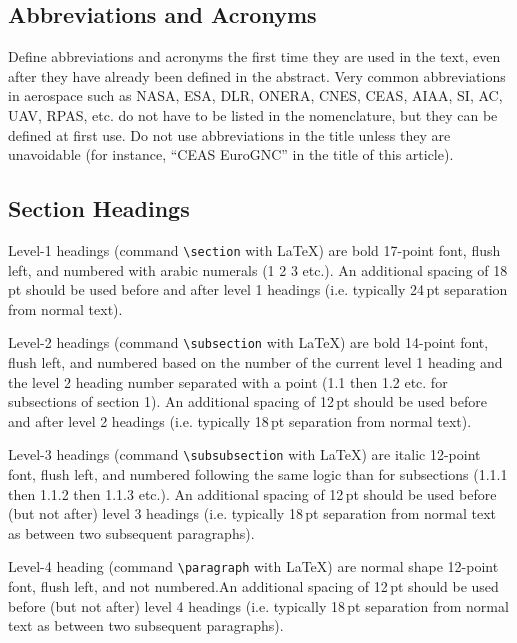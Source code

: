 \documentclass{CEAS_EuroGNC_2024}
\begin{document}
\subsection{Abbreviations and Acronyms}\label{sec:abbrv_accron}
Define abbreviations and acronyms the first time they are used in the text, even after they have already been defined in the abstract. Very common abbreviations in aerospace such as NASA, ESA, DLR, ONERA, CNES, CEAS, AIAA, SI, AC, UAV, RPAS, etc. do not have to be listed in the nomenclature, but they can be defined at first use. Do not use abbreviations in the title unless they are unavoidable (for instance, ``CEAS EuroGNC'' in the title of this article).


\subsection{Section Headings}

Level-1 headings (command \verb|\section| with LaTeX) are bold 17-point font, flush left, and numbered with arabic numerals (1 2 3 etc.). An additional spacing of 18\,pt should be used before and after level 1 headings (i.e. typically 24\,pt separation from normal text).

Level-2 headings (command \verb|\subsection| with LaTeX) are bold 14-point font, flush left, and numbered based on the number of the current level 1 heading and the level 2 heading number separated with a point (1.1  then 1.2 etc. for subsections of section 1). An additional spacing of 12\,pt should be used before and after level 2 headings (i.e. typically 18\,pt separation from normal text).

Level-3 headings (command \verb|\subsubsection| with LaTeX) are italic 12-point font, flush left, and numbered following the same logic than for subsections (1.1.1 then 1.1.2 then 1.1.3 etc.). An additional spacing of 12\,pt should be used before (but not after) level 3 headings (i.e. typically 18\,pt separation from normal text as between two subsequent paragraphs).

Level-4 heading (command \verb|\paragraph| with LaTeX) are normal shape 12-point font, flush left, and not numbered.An additional spacing of 12\,pt should be used before (but not after) level 4 headings (i.e. typically 18\,pt separation from normal text as between two subsequent paragraphs).
\end{document}
